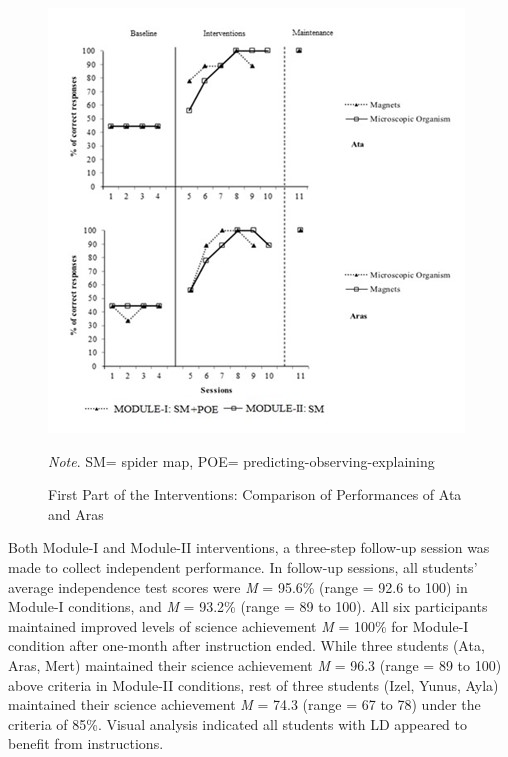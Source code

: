 \documentclass[11.5pt]{sig-alternate} %
\begin{document}
\begin{large}
\begin{figure}[ht]
    \includegraphics[width=1\linewidth]{images/fig2.jpg}
    \caption{First Part of the Interventions: Comparison of Performances of Ata and Aras} \vspace{1em}
    \textit{Note}. SM= spider map, POE= predicting-observing-explaining
\end{figure}

Both Module-I and Module-II interventions, a three-step follow-up session was made to collect independent performance. In follow-up sessions, all students’ average independence test scores were \textit{M} = 95.6\% (range = 92.6 to 100) in Module-I conditions, and \textit{M} = 93.2\% (range = 89 to 100). All six participants maintained improved levels of science achievement \textit{M} = 100\% for Module-I condition after one-month after instruction ended. While three students (Ata, Aras, Mert) maintained their science achievement \textit{M} = 96.3 (range = 89 to 100) above criteria in Module-II conditions, rest of three students (Izel, Yunus, Ayla) maintained their science achievement \textit{M} = 74.3 (range = 67 to 78) under the criteria of 85\%. Visual analysis indicated all students with LD appeared to benefit from instructions. 


\end{large}
\end{document}
